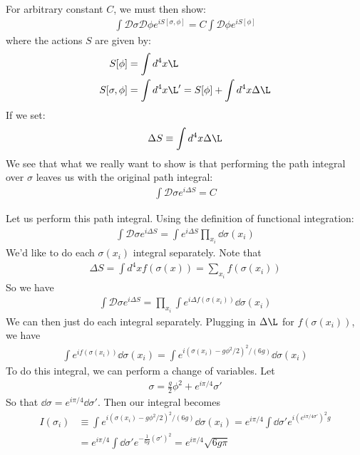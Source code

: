 \documentclass[12pt]{article}
\begin{document}
For arbitrary constant $C$, we must then show:
\begin{align*}
  \int\mathcal{D}\sigma\mathcal{D}\phi e^{i S[\sigma,\phi]}=
  C\int \mathcal{D} \phi e^{i S[\phi]}
\end{align*}
where the actions $S$ are given by:
\begin{align*}
  S[\phi] &= \int d^4 x \L \\
  S[\sigma,\phi] &= \int d^4 x \L'= S[\phi] + \int d^4 x \Delta \L
\end{align*}
If we set:
\begin{align*}
  \Delta S \equiv \int d^4 x \Delta \L
\end{align*}
We see that what we really want to show is that performing the path integral over $\sigma$ leaves us with the original path integral:
\begin{align*}
  \int \mathcal{D} \sigma  e^{i \Delta S } = C
\end{align*}

Let us perform this path integral. Using the definition of functional integration:
\begin{align*}
  \int\mathcal{D}\sigma  e^{i \Delta S }
  =\int e^{i \Delta S }\prod_{x_i}\dd{\sigma (x_i)}
\end{align*}
We'd like to do each $\sigma (x_i)$ integral separately. Note that
\begin{align*}
  \Delta S = \int d^4x f(\sigma(x))=\sum_{x_i} f(\sigma(x_i))
\end{align*}
So we have
\begin{align*}
  \int\mathcal{D}\sigma  e^{i \Delta S }=
  \prod_{x_i}\int e^{i\Delta f(\sigma(x_i))}\dd{\sigma (x_i)}
\end{align*}
We can then just do each integral separately. Plugging in $\Delta \L$ for $f(\sigma(x_i))$, we have
\begin{align*}
  \int e^{if(\sigma(x_i))}\dd{\sigma(x_i)}
  =\int e^{i (\sigma(x_i)-g\phi^2/2)^2/(6g)}\dd{\sigma (x_i)}
\end{align*}
To do this integral, we can perform a change of variables. Let
\begin{align*}
  \sigma=\frac{g}{2} \phi^2 + e^{i\pi/4}\sigma'
\end{align*}
So that $\dd{\sigma} = e^{i\pi /4} \dd{\sigma'}$. Then our integral becomes
\begin{align*}
  I(\sigma_i)&\equiv \int e^{i (\sigma (x_i)-g\phi^2/2)^2/(6g) }\dd{\sigma (x_i)}
  =e^{i\pi /4} \int \dd{\sigma'}e^{i(e^{i\pi/4 \sigma'})^2g}\\
  &=e^{i\pi /4} \int \dd{\sigma'}e^{-\frac{1}{6g}(\sigma')^2}
  =e^{i\pi /4} \sqrt{6g\pi}
\end{align*}
\end{document}
